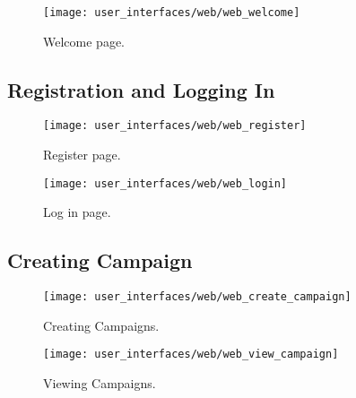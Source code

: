 \begin{figure}[!htbp]
\centering
\texttt{[image: user\_interfaces/web/web\_welcome]}
\caption{Welcome page.}
\label{fig:web_welcome}
\end{figure}
\FloatBarrier

\subsection{Registration and Logging In}

\begin{figure}[!htbp]
\centering
\texttt{[image: user\_interfaces/web/web\_register]}
\caption{Register page.}
\label{fig:web_register}
\end{figure}
\FloatBarrier

\begin{figure}[!htbp]
\centering
\texttt{[image: user\_interfaces/web/web\_login]}
\caption{Log in page.}
\label{fig:web_login}
\end{figure}
\FloatBarrier

\subsection{Creating Campaign}

\begin{figure}[!htbp]
\centering
\texttt{[image: user\_interfaces/web/web\_create\_campaign]}
\caption{Creating Campaigns.}
\label{fig:web_create_campaign}
\end{figure}
\FloatBarrier

\begin{figure}[!htbp]
\centering
\texttt{[image: user\_interfaces/web/web\_view\_campaign]}
\caption{Viewing Campaigns.}
\label{fig:web_view_campaign}
\end{figure}
\FloatBarrier
